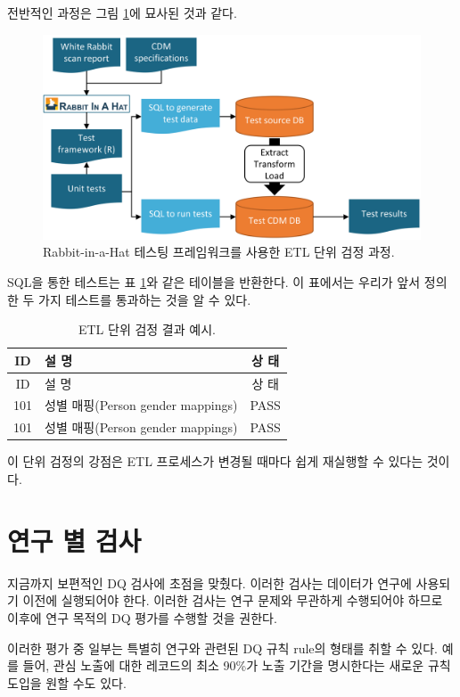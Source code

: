 \documentclass[10.5pt]{book}
\theoremstyle{definition}
\theoremstyle{definition}
\theoremstyle{definition}
\theoremstyle{remark}
\begin{document}
전반적인 과정은 그림 \ref{fig:testFramework}에 묘사된 것과 같다.

\begin{figure}

{\centering \includegraphics[width=0.9\linewidth]{images/DataQuality/testFramework} 

}

\caption{Rabbit-in-a-Hat 테스팅 프레임워크를 사용한 ETL 단위 검정 과정.}\label{fig:testFramework}
\end{figure}

SQL을 통한 테스트는 표 \ref{tab:exampleTestResults}와 같은 테이블을
반환한다. 이 표에서는 우리가 앞서 정의한 두 가지 테스트를 통과하는 것을
알 수 있다.

\begin{longtable}[]{@{}clc@{}}
\caption{\label{tab:exampleTestResults} ETL 단위 검정 결과
예시.}\tabularnewline
\toprule
ID & 설 명 & 상 태\tabularnewline
\midrule
\endfirsthead
\toprule
ID & 설 명 & 상 태\tabularnewline
\midrule
\endhead
101 & 성별 매핑(Person gender mappings) & PASS\tabularnewline
101 & 성별 매핑(Person gender mappings) & PASS\tabularnewline
\bottomrule
\end{longtable}

이 단위 검정의 강점은 ETL 프로세스가 변경될 때마다 쉽게 재실행할 수
있다는 것이다.

\section{연구 별 검사}\label{--}


지금까지 보편적인 DQ 검사에 초점을 맞췄다. 이러한 검사는 데이터가 연구에
사용되기 이전에 실행되어야 한다. 이러한 검사는 연구 문제와 무관하게
수행되어야 하므로 이후에 연구 목적의 DQ 평가를 수행할 것을 권한다.

이러한 평가 중 일부는 특별히 연구와 관련된 DQ 규칙 rule의 형태를 취할 수
있다. 예를 들어, 관심 노출에 대한 레코드의 최소 90\%가 노출 기간을
명시한다는 새로운 규칙 도입을 원할 수도 있다.
\end{document}
